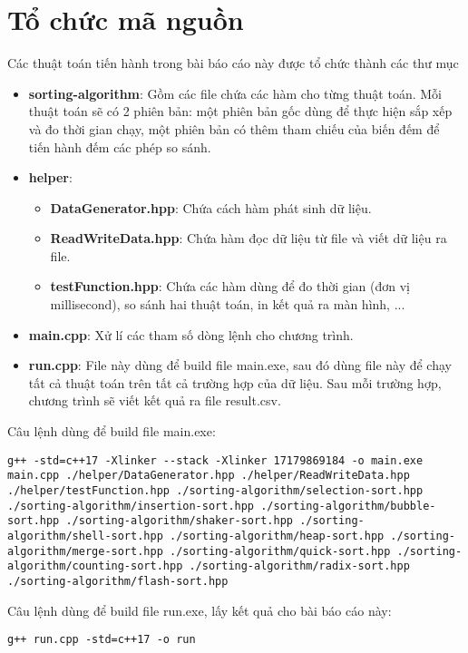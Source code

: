 \section{Tổ chức mã nguồn}

Các thuật toán tiến hành trong bài báo cáo này được tổ chức thành các thư mục
\begin{itemize}
    \item \textbf{sorting-algorithm}: Gồm các file chứa các hàm cho từng thuật toán. Mỗi thuật toán sẽ có 2 phiên bản: một phiên bản gốc dùng để thực hiện sắp xếp và đo thời gian chạy, một phiên bản có thêm tham chiếu của biến đếm để tiến hành đếm các phép so sánh. 
    \item \textbf{helper}:
    \begin{itemize}
        \item \textbf{DataGenerator.hpp}: Chứa cách hàm phát sinh dữ liệu.
        \item \textbf{ReadWriteData.hpp}: Chứa hàm đọc  dữ liệu từ file và viết dữ liệu ra file.
        \item \textbf{testFunction.hpp}: Chứa các hàm dùng để đo thời gian (đơn vị millisecond), so sánh hai thuật toán, in kết quả ra màn hình, ...
    \end{itemize}
    \item \textbf{main.cpp}: Xử lí các tham số dòng lệnh cho chương trình.
    \item \textbf{run.cpp}: File này dùng để build file main.exe, sau đó dùng file này để chạy tất cả thuật toán trên tất cả trường hợp của dữ liệu. Sau mỗi trường hợp, chương trình sẽ viết kết quả ra file result.csv.
\end{itemize}


Câu lệnh dùng để build file main.exe:
\begin{lstlisting}
g++ -std=c++17 -Xlinker --stack -Xlinker 17179869184 -o main.exe main.cpp ./helper/DataGenerator.hpp ./helper/ReadWriteData.hpp ./helper/testFunction.hpp ./sorting-algorithm/selection-sort.hpp ./sorting-algorithm/insertion-sort.hpp ./sorting-algorithm/bubble-sort.hpp ./sorting-algorithm/shaker-sort.hpp ./sorting-algorithm/shell-sort.hpp ./sorting-algorithm/heap-sort.hpp ./sorting-algorithm/merge-sort.hpp ./sorting-algorithm/quick-sort.hpp ./sorting-algorithm/counting-sort.hpp ./sorting-algorithm/radix-sort.hpp ./sorting-algorithm/flash-sort.hpp
\end{lstlisting}

Câu lệnh dùng để build file run.exe, lấy kết quả cho bài báo cáo này:
\begin{lstlisting}
g++ run.cpp -std=c++17 -o run
\end{lstlisting}



